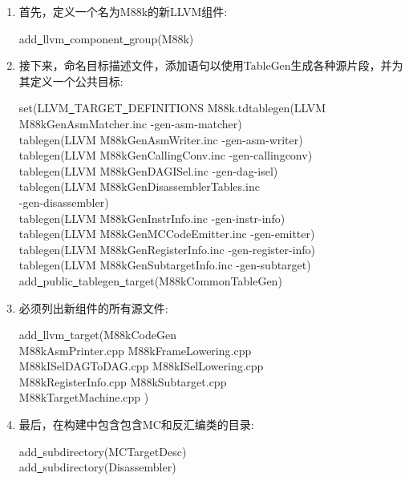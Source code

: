 \begin{enumerate}
\item 首先，定义一个名为M88k的新LLVM组件:
\begin{tcolorbox}[colback=white,colframe=black]
add\underline{~}llvm\underline{~}component\underline{~}group(M88k)
\end{tcolorbox}

\item 接下来，命名目标描述文件，添加语句以使用TableGen生成各种源片段，并为其定义一个公共目标:
\begin{tcolorbox}[colback=white,colframe=black]
set(LLVM\underline{~}TARGET\underline{~}DEFINITIONS M88k.tdtablegen(LLVM \\
M88kGenAsmMatcher.inc -gen-asm-matcher) \\
tablegen(LLVM M88kGenAsmWriter.inc -gen-asm-writer) \\
tablegen(LLVM M88kGenCallingConv.inc -gen-callingconv) \\
tablegen(LLVM M88kGenDAGISel.inc -gen-dag-isel) \\
tablegen(LLVM M88kGenDisassemblerTables.inc \\
\hspace*{8cm}-gen-disassembler) \\
tablegen(LLVM M88kGenInstrInfo.inc -gen-instr-info) \\
tablegen(LLVM M88kGenMCCodeEmitter.inc -gen-emitter) \\
tablegen(LLVM M88kGenRegisterInfo.inc -gen-register-info) \\
tablegen(LLVM M88kGenSubtargetInfo.inc -gen-subtarget) \\
add\underline{~}public\underline{~}tablegen\underline{~}target(M88kCommonTableGen)
\end{tcolorbox}

\item 必须列出新组件的所有源文件:
\begin{tcolorbox}[colback=white,colframe=black]
add\underline{~}llvm\underline{~}target(M88kCodeGen \\
\hspace*{0.5cm}M88kAsmPrinter.cpp M88kFrameLowering.cpp \\
\hspace*{0.5cm}M88kISelDAGToDAG.cpp M88kISelLowering.cpp \\
\hspace*{0.5cm}M88kRegisterInfo.cpp M88kSubtarget.cpp \\
\hspace*{0.5cm}M88kTargetMachine.cpp )
\end{tcolorbox}

\item 最后，在构建中包含包含MC和反汇编类的目录:
\begin{tcolorbox}[colback=white,colframe=black]
add\underline{~}subdirectory(MCTargetDesc) \\
add\underline{~}subdirectory(Disassembler)
\end{tcolorbox}

\end{enumerate}

